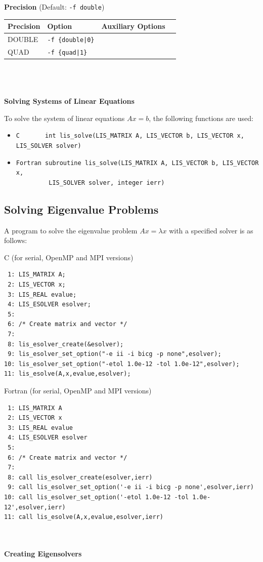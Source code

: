 \documentclass[a4paper]{article}
\begin{document}
\\ \\
\begin{minipage}[t]{\textwidth}
\begin{center}
{\bf Precision} (Default: \verb=-f double=)\\
\begin{tabular}{l|lll}\hline\hline
Precision     & Option           & Auxiliary Options \\ \hline
DOUBLE   & \verb=-f {double|0}=    &   \\
QUAD     & \verb=-f {quad|1}=      &   \\
\hline         
\end{tabular}
\end{center}
\end{minipage}
\\ \\ \\
\noindent
{\bf Solving Systems of Linear Equations}

To solve the system of linear equations $Ax = b$, the following functions are used:
\begin{itemize}
\item \verb|C       int lis_solve(LIS_MATRIX A, LIS_VECTOR b, LIS_VECTOR x, LIS_SOLVER solver)|
\item \verb|Fortran subroutine lis_solve(LIS_MATRIX A, LIS_VECTOR b, LIS_VECTOR x,|\\
      \verb|         LIS_SOLVER solver, integer ierr)|
\end{itemize}

\subsection{Solving Eigenvalue Problems}\label{subsec:solve}
A program to solve the eigenvalue problem $Ax = \lambda x$ with a specified 
solver is as follows: 
\begin{itembox}[l]{C (for serial, OpenMP and MPI versions)}
\small
\begin{verbatim}
 1: LIS_MATRIX A; 
 2: LIS_VECTOR x; 
 3: LIS_REAL evalue; 
 4: LIS_ESOLVER esolver; 
 5: 
 6: /* Create matrix and vector */ 
 7: 
 8: lis_esolver_create(&esolver); 
 9: lis_esolver_set_option("-e ii -i bicg -p none",esolver); 
10: lis_esolver_set_option("-etol 1.0e-12 -tol 1.0e-12",esolver); 
11: lis_esolve(A,x,evalue,esolver); 
\end{verbatim}
\end{itembox}
\begin{itembox}[l]{Fortran (for serial, OpenMP and MPI versions)}
\small
\begin{verbatim}
 1: LIS_MATRIX A 
 2: LIS_VECTOR x 
 3: LIS_REAL evalue
 4: LIS_ESOLVER esolver 
 5:
 6: /* Create matrix and vector */ 
 7:
 8: call lis_esolver_create(esolver,ierr) 
 9: call lis_esolver_set_option('-e ii -i bicg -p none',esolver,ierr) 
10: call lis_esolver_set_option('-etol 1.0e-12 -tol 1.0e-12',esolver,ierr) 
11: call lis_esolve(A,x,evalue,esolver,ierr) 
\end{verbatim}
\end{itembox}
\\ \\
\noindent
{\bf Creating Eigensolvers}
\end{document}
